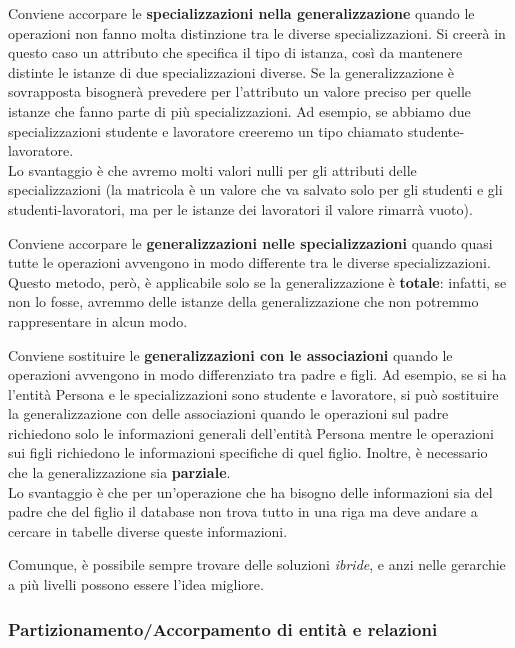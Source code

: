 \documentclass[11pt, a4paper, titlepage, oneside]{scrbook}
\begin{document}
Conviene accorpare le \textbf{specializzazioni nella generalizzazione} quando le operazioni non fanno molta distinzione tra le diverse specializzazioni. Si creerà in questo caso un attributo  che specifica il tipo di istanza, così da mantenere distinte le istanze di due specializzazioni diverse. Se la generalizzazione è sovrapposta bisognerà prevedere per l'attributo  un valore preciso per quelle istanze che fanno parte di più specializzazioni. Ad esempio, se abbiamo due specializzazioni studente e lavoratore creeremo un tipo chiamato studente-lavoratore. \\ 
Lo svantaggio è che avremo molti valori nulli per gli attributi delle specializzazioni (la matricola è un valore che va salvato solo per gli studenti e gli studenti-lavoratori, ma per le istanze dei lavoratori il valore rimarrà vuoto). 

Conviene accorpare le \textbf{generalizzazioni nelle specializzazioni} quando quasi tutte le operazioni avvengono in modo differente tra le diverse specializzazioni. Questo metodo, però, è applicabile solo se la generalizzazione è \textbf{totale}: infatti, se non lo fosse, avremmo delle istanze della generalizzazione che non potremmo rappresentare in alcun modo.

Conviene sostituire le \textbf{generalizzazioni con le associazioni} quando le operazioni avvengono in modo differenziato tra padre e figli. Ad esempio, se si ha l'entità Persona e le specializzazioni sono studente e lavoratore, si può sostituire la generalizzazione con delle associazioni quando le operazioni sul padre richiedono solo le informazioni generali dell'entità Persona mentre le operazioni sui figli richiedono le informazioni specifiche di quel figlio. Inoltre, è necessario che la generalizzazione sia \textbf{parziale}. \\
Lo svantaggio è che per un'operazione che ha bisogno delle informazioni sia del padre che del figlio il database non trova tutto in una riga ma deve andare a cercare in tabelle diverse queste informazioni.

Comunque, è possibile sempre trovare delle soluzioni \textit{ibride}, e anzi nelle gerarchie a più livelli possono essere l'idea migliore.

\subsubsection*{Partizionamento/Accorpamento di entità e relazioni}
\end{document}
